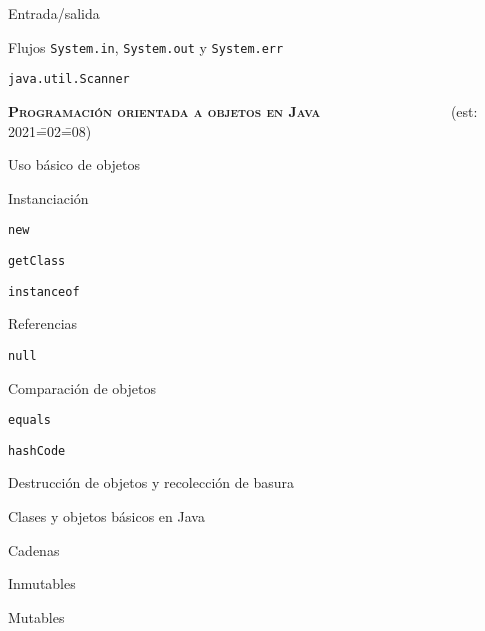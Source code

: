 \begin{longenum}
\begin{longenum}
        \item Entrada/salida
        \begin{longenum}
            \item Flujos \texttt{System.in}, \texttt{System.out} y \texttt{System.err}
            \item \texttt{java.util.Scanner}
        \end{longenum}
    \end{longenum}
    \item \textbf{\textsc{Programación orientada a objetos en Java}} \ \ \ \ \ \ \ \ \ \ \ \ \ \ \ \ \ \ (est: 2021\==02\==08)
    \begin{longenum}
        \item Uso básico de objetos
        \begin{longenum}
            \item Instanciación
            \begin{longenum}
                \item \texttt{new}
                \item \texttt{getClass}
                \item \texttt{instanceof}
            \end{longenum}
            \item Referencias
            \begin{longenum}
                \item \texttt{null}
            \end{longenum}
            \item Comparación de objetos
            \begin{longenum}
                \item \texttt{equals}
                \item \texttt{hashCode}
            \end{longenum}
            \item Destrucción de objetos y recolección de basura
        \end{longenum}
        \item Clases y objetos básicos en Java
        \begin{longenum}
            \item Cadenas
            \begin{longenum}
                \item Inmutables
                \item Mutables

\end{longenum}
\end{longenum}
\end{longenum}
\end{longenum}
